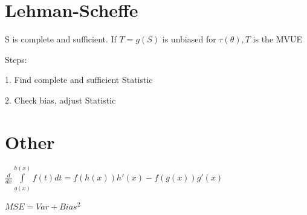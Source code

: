 \documentclass{article}
\let\Oldint=\int
\renewcommand{\int}{\Oldint\limits}
\begin{document}
\section{Lehman-Scheffe}

S is complete and sufficient. If $T = g(S)$ is unbiased for $\tau(\theta), T$ is the MVUE 

Steps: 

1. Find complete and sufficient Statistic

2. Check bias, adjust Statistic

\section{Other}

$\frac{d}{dx} \int_{g(x)}^{h(x)} f(t)dt = f(h(x))h'(x) - f(g(x))g'(x)$

$MSE = Var + Bias^2$
\end{document}
